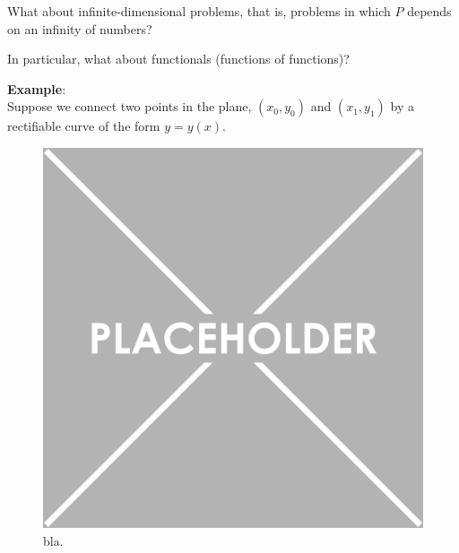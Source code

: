 What about infinite-dimensional problems, that is, problems in which $P$ depends on an infinity of numbers?

In particular, what about functionals (functions of functions)?

\bigbreak

\textbf{Example}:\\
Suppose we connect two points in the plane, $(x_0, y_0)$ and $(x_1, y_1)$ by a rectifiable curve of the form $y = y(x)$. 



\begin{figure}
    \centering
    \includegraphics[width=\textwidth ]{figures/placeholder.png}
    \caption{bla.}
    \label{fig:}
\end{figure}
